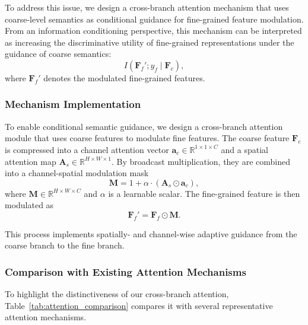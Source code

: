 \documentclass[pdflatex,iicol,sn-mathphys-num]{sn-jnl}
\theoremstyle{thmstyleone}%
\theoremstyle{thmstyletwo}%
\theoremstyle{thmstylethree}%
\begin{document}
To address this issue, we design a cross-branch attention mechanism that uses coarse-level semantics as conditional guidance for fine-grained feature modulation. From an information conditioning perspective, this mechanism can be interpreted as increasing the discriminative utility of fine-grained representations under the guidance of coarse semantics:
\begin{equation}
I(\mathbf{F}_f'; y_f \mid \mathbf{F}_c),
\end{equation}
where $\mathbf{F}_f'$ denotes the modulated fine-grained features.

\subsubsection{Mechanism Implementation}
To enable conditional semantic guidance, we design a cross-branch attention module that uses coarse features to modulate fine features. 
The coarse feature $\mathbf{F}_c$ is compressed into a channel attention vector $\mathbf{a}_c \in \mathbb{R}^{1\times1\times C}$ and a spatial attention map $\mathbf{A}_s \in \mathbb{R}^{H \times W \times 1}$. 
By broadcast multiplication, they are combined into a channel-spatial modulation mask
\begin{equation}
\mathbf{M} = 1 + \alpha \cdot (\mathbf{A}_s \odot \mathbf{a}_c),
\label{eq:attention_mask}
\end{equation}
where $\mathbf{M}\in\mathbb{R}^{H\times W\times C}$ and $\alpha$ is a learnable scalar. 
The fine-grained feature is then modulated as
\begin{equation}
\mathbf{F}_f' = \mathbf{F}_f \odot \mathbf{M}.
\label{eq:feature_modulation}
\end{equation}

This process implements spatially- and channel-wise adaptive guidance from the coarse branch to the fine branch.

\subsubsection{Comparison with Existing Attention Mechanisms}
To highlight the distinctiveness of our cross-branch attention, Table~\ref{tab:attention_comparison} compares it with several representative attention mechanisms.
\end{document}
